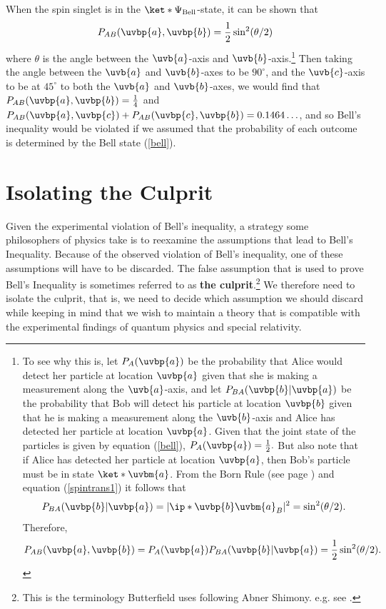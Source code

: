 \documentclass[12pt]{report}
\begin{document}
When the spin singlet is in the $\ket*{\Psi_{\text{Bell}}}$-state, it can be shown that 
      \begin{equation}\label{bellsin}
      P_{AB}(\uvbp{a},\uvbp{b})=\frac{1}{2}\sin^2(\theta/2)
      \end{equation}
where $\theta$ is the angle between the $\uvb{a}$-axis and $\uvb{b}$-axis.\footnote{To see why this is, let $P_A(\uvbp{a})$ be the probability that Alice would detect her particle at location $\uvbp{a}$ given that she is making a measurement along the $\uvb{a}$-axis, and let $P_{BA}(\uvbp{b}|\uvbp{a})$ be the probability that Bob will detect his particle at location $\uvbp{b}$ given that he is making a measurement along the $\uvb{b}$-axis and Alice has detected her particle at location $\uvbp{a}$. Given that the joint state of the particles is given by equation (\ref{bell}), $P_A(\uvbp{a})=\frac{1}{2}.$ But also note that if  Alice has detected her particle at location $\uvbp{a}$, then Bob's particle must be in state $\ket*{\uvbm{a}}$. From the Born Rule (see page \pageref{bornrule}) and equation (\ref{spintrans1}) it follows that 
      $$P_{BA}(\uvbp{b}|\uvbp{a})= |\ip*{\uvbp{b}}{\uvbm{a}}_B|^2=\sin^2(\theta/2).$$ 
Therefore, 
$$P_{AB}(\uvbp{a},\uvbp{b})= P_A(\uvbp{a})P_{BA}(\uvbp{b}|\uvbp{a})=\frac{1}{2}\sin^2(\theta/2).$$} 
Then taking the angle between the $\uvb{a}$ and $\uvb{b}$-axes to be $90^\circ$, and the $\uvb{c}$-axis to be at $45^\circ$ to both the $\uvb{a}$ and $\uvb{b}$-axes, we would find that $P_{AB}(\uvbp{a},\uvbp{b})=\frac{1}{4}$ and $P_{AB}(\uvbp{a},\uvbp{c})+P_{AB}(\uvbp{c},\uvbp{b})=0.1464\ldots$, and so Bell's inequality would be violated if we assumed that the probability of each outcome is determined by the Bell state  (\ref{bell}). 
      

\section{Isolating the Culprit}
Given the experimental violation of Bell's inequality, a strategy some philosophers of physics take is to reexamine the assumptions that lead to Bell's Inequality. Because of the observed violation of Bell's inequality, one of these assumptions will have to be discarded. The false assumption that is used to prove Bell's Inequality is sometimes referred to as \textbf{the culprit}.\footnote{This is the terminology Butterfield uses following Abner Shimony. e.g. see \cite[1]{Butterfield}.} We therefore need to isolate the culprit, that is, we need to decide which assumption we should discard while keeping in mind that we wish to maintain a theory that is compatible with the experimental findings of quantum physics and special relativity.
\end{document}
